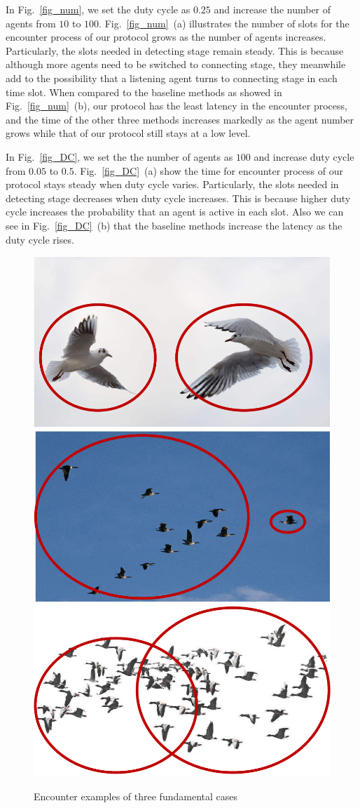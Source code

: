 In Fig.~\ref{fig_num}, we set the duty cycle as $0.25$ and 
increase the number of agents from $10$ to $100$.
Fig.~\ref{fig_num}~(a) illustrates
the number of slots for the encounter process 
of our protocol grows as the number of agents increases. Particularly,
the slots needed in detecting stage remain steady.
This is because although more agents need to be switched to connecting stage,
they meanwhile add to the possibility
that a listening agent turns to connecting stage in each time slot.
When compared to the baseline methods as showed in
Fig.~\ref{fig_num}~(b), our protocol has the least latency in
the encounter process, and the time of the other three methods increases
markedly as the agent number grows while that of our protocol still
stays at a low level.

In Fig.~\ref{fig_DC}, we set the the number of agents as $100$ and
increase duty cycle from $0.05$ to $0.5$. Fig.~\ref{fig_DC}~(a) show 
the time for encounter process of our protocol stays steady when duty cycle varies.
Particularly, the slots needed in detecting stage decreases when duty cycle increases.
This is because higher duty cycle increases the probability that an agent is active in each slot.
Also we can see in Fig.~\ref{fig_DC}~(b) that the baseline methods
increase the latency as the duty cycle rises.

\begin{figure}[!t]
    \includegraphics[width=.32\textwidth]{figures/AtoA}
    \includegraphics[width=.32\textwidth]{figures/AtoG}
    \includegraphics[width=.32\textwidth]{figures/GtoG}
    \caption{Encounter examples of three fundamental cases}
    \label{examples}
\end{figure}

